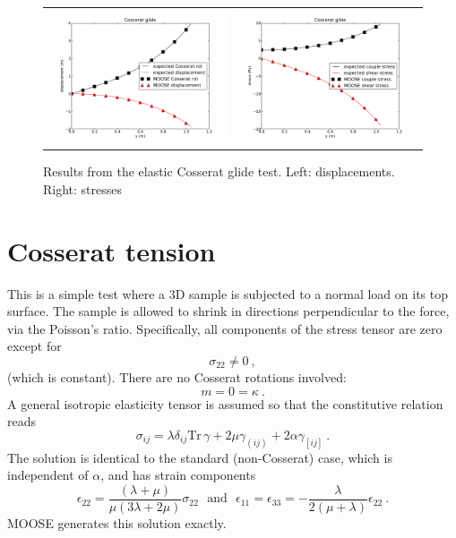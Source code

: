 \documentclass[]{scrreprt}
\newcommand{\si}{\sigma}
\newcommand{\ga}{\gamma}
\newcommand{\de}{\delta}
\newcommand{\la}{\lambda}
\newcommand{\tr}{\mbox{Tr}\,}
\newcommand{\al}{\alpha}
\begin{document}
\begin{figure}[htb]
\begin{center}
\begin{tabular}{cc}
\includegraphics[width=8cm]{cosserat_glide_disp.pdf}
&
\includegraphics[width=8cm]{cosserat_glide_stress.pdf}
\end{tabular}
\caption{Results from the elastic Cosserat glide test.  Left:
  displacements.  Right: stresses}
\label{glide_elast.fig}
\end{center}
\end{figure}


\chapter{Cosserat tension}

This is a simple test where a 3D sample is subjected to a normal load
on its top surface.  The sample is allowed to shrink in directions
perpendicular to the force, via the Poisson's ratio.  Specifically,
all components of the stress tensor are zero except for
\begin{equation}
\sigma_{22} \neq 0 \ ,
\end{equation}
(which is constant).
There are no Cosserat rotations involved:
\begin{equation}
m = 0 = \kappa \ .
\end{equation}
A general isotropic elasticity tensor is assumed so that the
constitutive relation reads
\begin{equation}
\si_{ij} = \la\de_{ij}\tr\ga + 2\mu\ga_{(ij)} + 2\al\ga_{[ij]} \ .
\end{equation}
The solution is identical to the standard (non-Cosserat) case, which
is independent of $\al$, and has strain components
\begin{equation}
\epsilon_{22} = \frac{(\la + \mu)}{\mu(3\la + 2\mu)}\sigma_{22}
\ \ \ \mbox{and}\ \ \
\epsilon_{11} = \epsilon_{33} = -\frac{\la}{2(\mu + \la)}\epsilon_{22}
\ .
\end{equation}
MOOSE generates this solution exactly.
\end{document}
